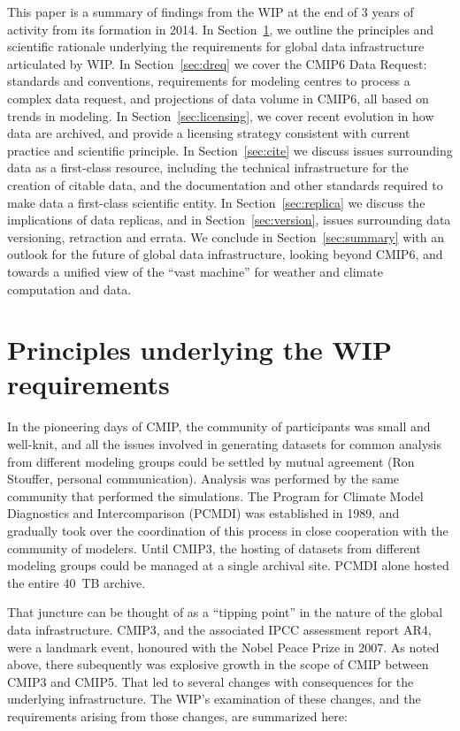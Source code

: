 \documentclass[gmd,manuscript]{copernicus}
\newcommand{\secref}[1] {\mbox{Section  \ref{sec:#1}}}
\begin{document}
This paper is a summary of findings from the WIP at the end of 3 years
of activity from its formation in 2014. In \secref{principles}, we
outline the principles and scientific rationale underlying the
requirements for global data infrastructure articulated by WIP. In
\secref{dreq} we cover the CMIP6 Data Request: standards and
conventions, requirements for modeling centres to process a complex
data request, and projections of data volume in CMIP6, all based on
trends in modeling. In \secref{licensing}, we cover recent evolution
in how data are archived, and provide a licensing strategy consistent
with current practice and scientific principle. In \secref{cite} we
discuss issues surrounding data as a first-class resource, including
the technical infrastructure for the creation of citable data, and the
documentation and other standards required to make data a first-class
scientific entity. In \secref{replica} we discuss the implications of
data replicas, and in \secref{version}, issues surrounding data
versioning, retraction and errata. We conclude in \secref{summary}
with an outlook for the future of global data infrastructure, looking
beyond CMIP6, and towards a unified view of the ``vast machine'' for
weather and climate computation and data.

\section{Principles underlying the WIP requirements}
\label{sec:principles}

In the pioneering days of CMIP, the community of participants was
small and well-knit, and all the issues involved in generating
datasets for common analysis from different modeling groups could be
settled by mutual agreement (Ron Stouffer, personal communication).
Analysis was performed by the same community that performed the
simulations. The Program for Climate Model Diagnostics and
Intercomparison (PCMDI) was established in 1989, and gradually took
over the coordination of this process in close cooperation with the
community of modelers. Until CMIP3, the hosting of datasets from
different modeling groups could be managed at a single archival site.
PCMDI alone hosted the entire 40~TB archive.

That juncture can be thought of as a ``tipping point'' in the nature
of the global data infrastructure. CMIP3, and the associated IPCC
assessment report AR4, were a landmark event, honoured with the Nobel
Peace Prize in 2007. As noted above, there subequently was explosive
growth in the scope of CMIP between CMIP3 and CMIP5. That led to
several changes with consequences for the underlying infrastructure.
The WIP's examination of these changes, and the requirements arising
from those changes, are summarized here:
\end{document}
